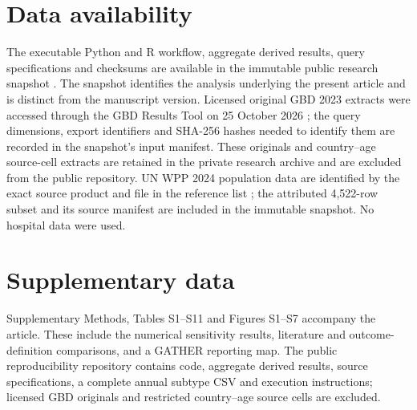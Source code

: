\documentclass[11pt,a4paper]{article}
\begin{document}
\section*{Data availability}
The executable Python and R workflow, aggregate derived results, query specifications and checksums are available in the immutable public research snapshot \citep{repository}. The snapshot identifies the analysis underlying the present article and is distinct from the manuscript version. Licensed original GBD 2023 extracts were accessed through the GBD Results Tool on 25 October 2026 \citep{results}; the query dimensions, export identifiers and SHA-256 hashes needed to identify them are recorded in the snapshot's input manifest. These originals and country--age source-cell extracts are retained in the private research archive and are excluded from the public repository. UN WPP 2024 population data are identified by the exact source product and file in the reference list \citep{wpp2024}; the attributed 4,522-row subset and its source manifest are included in the immutable snapshot. No hospital data were used.

\section*{Supplementary data}
Supplementary Methods, Tables S1--S11 and Figures S1--S7 accompany the article. These include the numerical sensitivity results, literature and outcome-definition comparisons, and a GATHER reporting map. The public reproducibility repository contains code, aggregate derived results, source specifications, a complete annual subtype CSV and execution instructions; licensed GBD originals and restricted country--age source cells are excluded.
\end{document}
